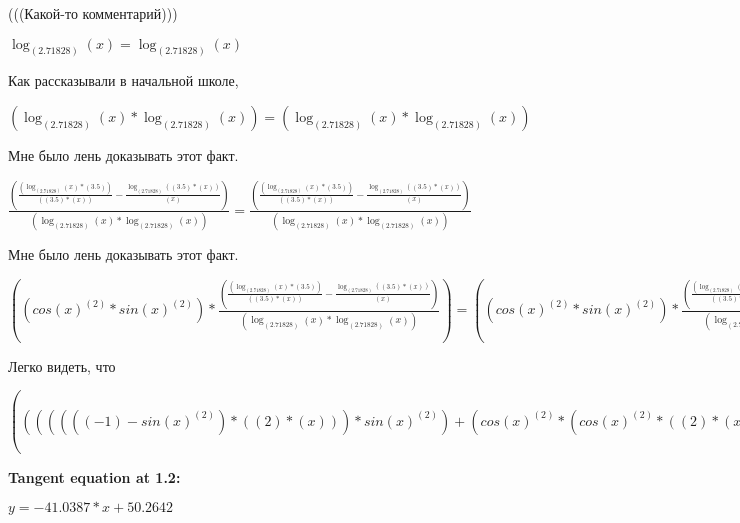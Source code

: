 \documentclass[12pt,a4paper,fleqn]{article}
\theoremstyle{definition}
\begin{document}
(((Какой-то комментарий)))

$\log_{( 2.71828 )}{( x )} = \log_{( 2.71828 )}{( x )}$

Как рассказывали в начальной школе,

$(\log_{( 2.71828 )}{( x )} * \log_{( 2.71828 )}{( x )}) = (\log_{( 2.71828 )}{( x )} * \log_{( 2.71828 )}{( x )})$

Мне было лень доказывать этот факт.

$\frac{(\frac{(\log_{( 2.71828 )}{( x )} * ( 3.5 ))}{(( 3.5 ) * ( x ))}
 - \frac{\log_{( 2.71828 )}{(( 3.5 ) * ( x ))}}{( x )}
)}{(\log_{( 2.71828 )}{( x )} * \log_{( 2.71828 )}{( x )})}
 = \frac{(\frac{(\log_{( 2.71828 )}{( x )} * ( 3.5 ))}{(( 3.5 ) * ( x ))}
 - \frac{\log_{( 2.71828 )}{(( 3.5 ) * ( x ))}}{( x )}
)}{(\log_{( 2.71828 )}{( x )} * \log_{( 2.71828 )}{( x )})}
$

Мне было лень доказывать этот факт.

$((cos{( x )}^{( 2 )} * sin{( x )}^{( 2 )}) * \frac{(\frac{(\log_{( 2.71828 )}{( x )} * ( 3.5 ))}{(( 3.5 ) * ( x ))}
 - \frac{\log_{( 2.71828 )}{(( 3.5 ) * ( x ))}}{( x )}
)}{(\log_{( 2.71828 )}{( x )} * \log_{( 2.71828 )}{( x )})}
) = ((cos{( x )}^{( 2 )} * sin{( x )}^{( 2 )}) * \frac{(\frac{(\log_{( 2.71828 )}{( x )} * ( 3.5 ))}{(( 3.5 ) * ( x ))}
 - \frac{\log_{( 2.71828 )}{(( 3.5 ) * ( x ))}}{( x )}
)}{(\log_{( 2.71828 )}{( x )} * \log_{( 2.71828 )}{( x )})}
)$

Легко видеть, что

$((((((( -1 ) - sin{( x )}^{( 2 )}) * (( 2 ) * ( x ))) * sin{( x )}^{( 2 )}) + (cos{( x )}^{( 2 )} * (cos{( x )}^{( 2 )} * (( 2 ) * ( x ))))) * \log_{( x )}{(( 3.5 ) * ( x ))}) + ((cos{( x )}^{( 2 )} * sin{( x )}^{( 2 )}) * \frac{(\frac{(\log_{( 2.71828 )}{( x )} * ( 3.5 ))}{(( 3.5 ) * ( x ))}
 - \frac{\log_{( 2.71828 )}{(( 3.5 ) * ( x ))}}{( x )}
)}{(\log_{( 2.71828 )}{( x )} * \log_{( 2.71828 )}{( x )})}
)) = ((((((( -1 ) - sin{( x )}^{( 2 )}) * (( 2 ) * ( x ))) * sin{( x )}^{( 2 )}) + (cos{( x )}^{( 2 )} * (cos{( x )}^{( 2 )} * (( 2 ) * ( x ))))) * \log_{( x )}{(( 3.5 ) * ( x ))}) + ((cos{( x )}^{( 2 )} * sin{( x )}^{( 2 )}) * \frac{(\frac{(\log_{( 2.71828 )}{( x )} * ( 3.5 ))}{(( 3.5 ) * ( x ))}
 - \frac{\log_{( 2.71828 )}{(( 3.5 ) * ( x ))}}{( x )}
)}{(\log_{( 2.71828 )}{( x )} * \log_{( 2.71828 )}{( x )})}
))$


\textbf{Tangent equation at 1.2:}

$y = -41.0387 * x + 50.2642$
\end{document}
